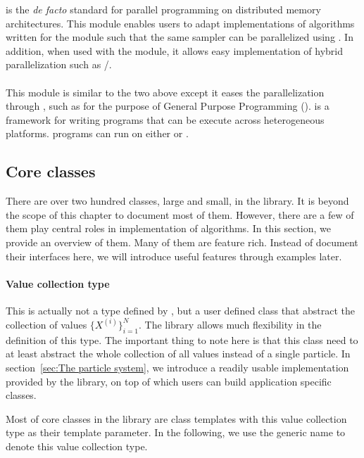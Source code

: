 \mpi is the \emph{de facto} standard for parallel programming on distributed
memory architectures. This module enables users to adapt implementations of
algorithms written for the \smp module such that the same sampler can be
parallelized using \mpi. In addition, when used with the \smp module, it
allows easy implementation of hybrid parallelization such as \mpi/\openmp.

\paragraph{\opencl}

This module is similar to the two above except it eases the parallelization
through \opencl, such as for the purpose of General Purpose \gpu Programming
(\gpgpu). \opencl is a framework for writing programs that can be execute
across heterogeneous platforms. \opencl programs can run on either \cpu or
\gpu.

\subsection{Core classes}
\label{sub:Core classes}

There are over two hundred classes, large and small, in the \vsmc library. It
is beyond the scope of this chapter to document most of them. However, there
are a few of them play central roles in implementation of \smc algorithms. In
this section, we provide an overview of them. Many of them are feature rich.
Instead of document their interfaces here, we will introduce useful features
through examples later.

\paragraph{Value collection type}

This is actually not a type defined by \vsmc, but a user defined class that
abstract the collection of values $\{X^{(i)}\}_{i=1}^N$. The library allows
much flexibility in the definition of this type. The important thing to note
here is that this class need to at least abstract the whole collection of all
values instead of a single particle. In section~\ref{sec:The particle system},
we introduce a readily usable implementation provided by the \vsmc library, on
top of which users can build application specific classes.

Most of core classes in the library are class templates with this value
collection type as their template parameter. In the following, we use the
generic name  to denote this value collection type.

